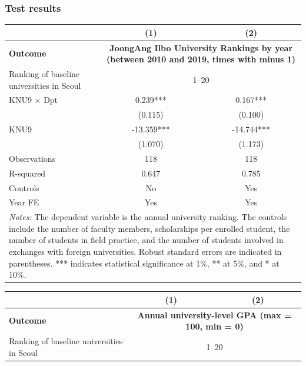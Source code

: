 \documentclass[aspectratio=169,xcolor=dvipsnames,handout]{beamer}
\begin{document}
\begin{frame}[allowframebreaks]
    \frametitle{Test results}
    \begin{table}
        \scriptsize
        \centering
        \begin{tabular}{lcc}
        \toprule
        & (1) & (2) \\
        \midrule
        \textbf{Outcome} & \multicolumn{2}{p{5cm}}{\textbf{JoongAng Ilbo University Rankings by year (between 2010 and 2019, times with minus 1)}} \\
        \midrule
        Ranking of baseline universities in Seoul & \multicolumn{2}{c}{1--20} \\
        \midrule
        KNU9 $\times$ Dpt & 0.239***   & 0.167***   \\
                        & (0.115)    & (0.100)    \\
        KNU9              & -13.359*** & -14.744*** \\
                        & (1.070)    & (1.173)    \\
        \midrule
        Observations      & 118        & 118        \\
        R-squared         & 0.647      & 0.785      \\
        Controls          & No         & Yes        \\
        Year FE           & Yes        & Yes        \\
        \bottomrule
        \multicolumn{3}{p{11cm}}{\tiny\textit{Notes:} The dependent variable is the annual university ranking\@. The controls include the number of faculty members, scholarships per enrolled student, the number of students in field practice, and the number of students involved in exchanges with foreign universities. Robust standard errors are indicated in parentheses. *** indicates statistical significance at 1\%, ** at 5\%, and * at 10\%.} \\
        \end{tabular}
    \end{table}
    \framebreak%
    \begin{table}
        \scriptsize
        \centering
        \begin{tabular}{lcc}
        \toprule
        & (1) & (2) \\
        \midrule
        \textbf{Outcome} & \multicolumn{2}{p{5cm}}{\textbf{Annual university-level GPA (max = 100, min = 0)}} \\
        \midrule
        Ranking of baseline universities in Seoul & \multicolumn{2}{c}{1--20} \\

\end{tabular}
\end{table}
\end{frame}
\end{document}
